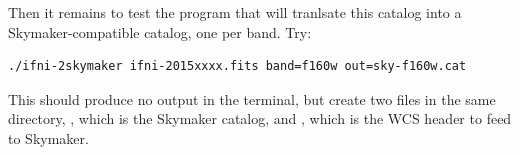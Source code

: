 \documentclass[12pt,a4paper]{article}
\begin{document}
Then it remains to test the program that will tranlsate this catalog into a Skymaker-compatible catalog, one per band. Try:
\begin{verbatim}
./ifni-2skymaker ifni-2015xxxx.fits band=f160w out=sky-f160w.cat
\end{verbatim}

This should produce no output in the terminal, but create two files in the same directory, , which is the Skymaker catalog, and , which is the WCS header to feed to Skymaker.
\end{document}
